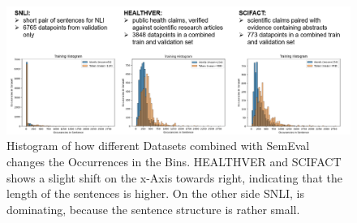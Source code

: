 \begin{figure}[t]
    \hspace*{-1.75cm}
    \centering
    \includegraphics[width=1.3\textwidth]{./content/Histogram_Dataset.png}
    \caption{Histogram of how different Datasets combined with SemEval changes the
             Occurrences in the Bins. HEALTHVER and SCIFACT shows a slight
             shift on the x-Axis towards right, indicating that the length
             of the sentences is higher. On the other side SNLI, is dominating, 
             because the sentence structure is rather small. }
    \label{tab:histo}
\end{figure}






















